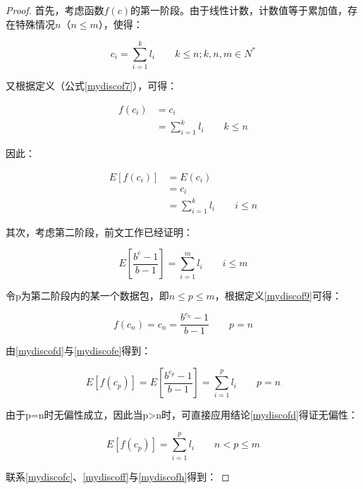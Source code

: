 \begin{proof}
	首先，考虑函数$ f(c) $的第一阶段。由于线性计数，计数值等于累加值，存在特殊情况$n$（$ n\leq m $），使得：

	\begin{equation} \label{mydiscofa}
	c_i=\sum ^{k}_{i=1}l_{i} \quad\quad k \leq n; k,n,m \in N^{\ast}
	\end{equation}
	
	又根据定义（公式\ref{mydiscof7}），可得：
	
	\begin{align}\label{mydiscofb}
	f(c_i) &= c_i \nonumber \\
	&=\sum ^{k}_{i=1}l_{i} \quad\quad k \leq n
	\end{align}
	
	因此：
	
	\begin{align}\label{mydiscofc}
	E[f(c_i)] &= E(c_i) \nonumber \\
	&=c_i \nonumber  \\
	&=\sum ^{k}_{i=1}l_{i} \quad\quad i \leq n
	\end{align}
	
	其次，考虑第二阶段，前文工作已经证明：
	
	\begin{equation} \label{mydiscofd}
	E[\dfrac{b^c-1}{b-1}]=\sum_{i=1}^{m}l_i \quad\quad i \leq m
	\end{equation}
	
	令p为第二阶段内的某一个数据包，即$ n \leq p \leq m $，根据定义\ref{mydiscof9}可得：
	
	\begin{equation} \label{mydiscofe}
		f(c_n) = c_n = \dfrac{b^{c_n}-1}{b-1}\quad\quad p=n
	\end{equation}
	
	由\ref{mydiscofd}与\ref{mydiscofe}得到：
	
	\begin{equation} \label{mydiscoff}
	E[f(c_p)]=E[\dfrac{b^{c_p}-1}{b-1}]=\sum_{i=1}^{p}l_i\quad\quad p=n
	\end{equation}
	
	由于p=n时无偏性成立，因此当p>n时，可直接应用结论\ref{mydiscofd}得证无偏性：
	
	\begin{equation} \label{mydiscofh}
	E[f(c_p)]  = \sum_{i=1}^{p}l_i \quad\quad n<p\leq m
	\end{equation}
	
	联系\ref{mydiscofc}、\ref{mydiscoff}与\ref{mydiscofh}得到：
	

\end{proof}
